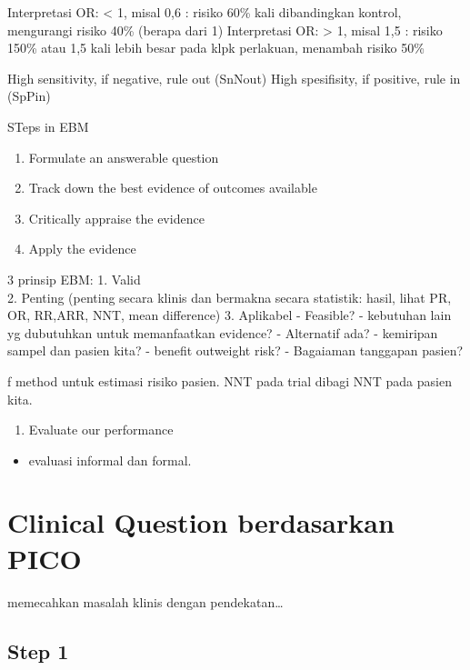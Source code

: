 \documentclass[
  letterpaper,
  DIV=11,
  numbers=noendperiod]{scrreprt}
\providecommand{\tightlist}{%
  \setlength{\itemsep}{0pt}\setlength{\parskip}{0pt}}\usepackage{longtable,booktabs,array}
\begin{document}
Interpretasi OR: \textless{} 1, misal 0,6 : risiko 60\% kali
dibandingkan kontrol, mengurangi risiko 40\% (berapa dari 1)
Interpretasi OR: \textgreater{} 1, misal 1,5 : risiko 150\% atau 1,5
kali lebih besar pada klpk perlakuan, menambah risiko 50\%

High sensitivity, if negative, rule out (SnNout) High spesifisity, if
positive, rule in (SpPin)

STeps in EBM

\begin{enumerate}
\def\labelenumi{\arabic{enumi}.}
\item
  Formulate an answerable question
\item
  Track down the best evidence of outcomes available
\item
  Critically appraise the evidence
\item
  Apply the evidence
\end{enumerate}

3 prinsip EBM: 1. Valid\\
2. Penting (penting secara klinis dan bermakna secara statistik: hasil,
lihat PR, OR, RR,ARR, NNT, mean difference) 3. Aplikabel - Feasible? -
kebutuhan lain yg dubutuhkan untuk memanfaatkan evidence? - Alternatif
ada? - kemiripan sampel dan pasien kita? - benefit outweight risk? -
Bagaiaman tanggapan pasien?

f method untuk estimasi risiko pasien. NNT pada trial dibagi NNT pada
pasien kita.

\begin{enumerate}
\def\labelenumi{\arabic{enumi}.}
\setcounter{enumi}{4}
\tightlist
\item
  Evaluate our performance
\end{enumerate}

\begin{itemize}
\tightlist
\item
  evaluasi informal dan formal.
\end{itemize}

\section{Clinical Question berdasarkan
PICO}\label{clinical-question-berdasarkan-pico}

memecahkan masalah klinis dengan pendekatan\ldots{}

\subsection{Step 1}\label{step-1}
\end{document}
